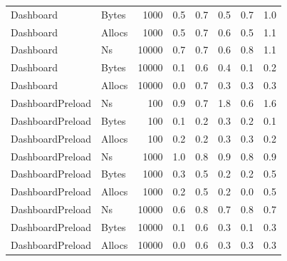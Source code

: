 \begin{table}[ht]
\begin{tabular}{llrrrrrr}
	Dashboard & Bytes & 1000 &  0.5 &  0.7 &  0.5 &  0.7 &  1.0 \\
	Dashboard & Allocs & 1000 &  0.5 &  0.7 &  0.6 &  0.5 &  1.1 \\
	Dashboard & Ns & 10000 &  0.7 &  0.7 &  0.6 &  0.8 &  1.1 \\
	Dashboard & Bytes & 10000 &  0.1 &  0.6 &  0.4 &  0.1 &  0.2 \\
	Dashboard & Allocs & 10000 &  0.0 &  0.7 &  0.3 &  0.3 &  0.3 \\
	DashboardPreload & Ns & 100 &  0.9 &  0.7 &  1.8 &  0.6 &  1.6 \\
	DashboardPreload & Bytes & 100 &  0.1 &  0.2 &  0.3 &  0.2 &  0.1 \\
	DashboardPreload & Allocs & 100 &  0.2 &  0.2 &  0.3 &  0.3 &  0.2 \\
	DashboardPreload & Ns & 1000 &  1.0 &  0.8 &  0.9 &  0.8 &  0.9 \\
	DashboardPreload & Bytes & 1000 &  0.3 &  0.5 &  0.2 &  0.2 &  0.5 \\
	DashboardPreload & Allocs & 1000 &  0.2 &  0.5 &  0.2 &  0.0 &  0.5 \\
	DashboardPreload & Ns & 10000 &  0.6 &  0.8 &  0.7 &  0.8 &  0.7 \\
	DashboardPreload & Bytes & 10000 &  0.1 &  0.6 &  0.3 &  0.1 &  0.3 \\
	DashboardPreload & Allocs & 10000 &  0.0 &  0.6 &  0.3 &  0.3 &  0.3 \\
\bottomrule
\end{tabular}
\label{tab:variationskoeffizienten_sqlt-cache}
\end{table}
	